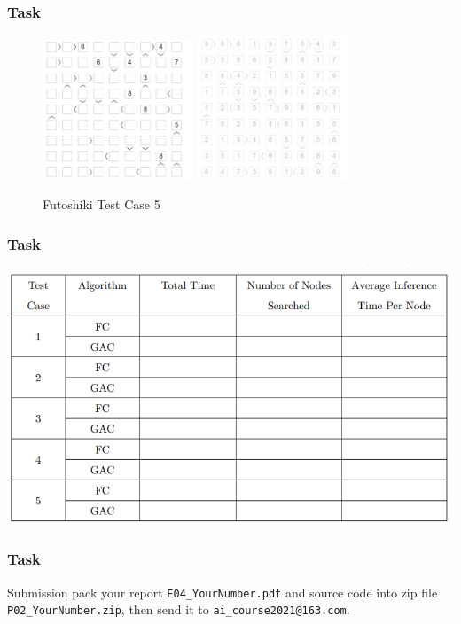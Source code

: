 \documentclass{beamer}
\begin{document}
\begin{frame}    \frametitle{Task}
        \begin{figure}[htbp]
    \centering
    \includegraphics[width=4.5cm]{Pic/f5}
    \qquad
    \includegraphics[width=4.5cm]{Pic/f5s}
    \caption{Futoshiki Test Case 5}
    \label{fig:case55}
  \end{figure}

\end{frame}

\begin{frame}    \frametitle{Task}

 \includegraphics[width=1.0\textwidth]{Pic/tab}


\end{frame}

\begin{frame} \frametitle{Task}
  \begin{block}{Submission}
    pack your report \texttt{E04\_YourNumber.pdf} and source code into zip file \texttt{P02\_YourNumber.zip}, then send it to \texttt{ai\_course2021@163.com}.
  \end{block}
\end{frame}
\end{document}
